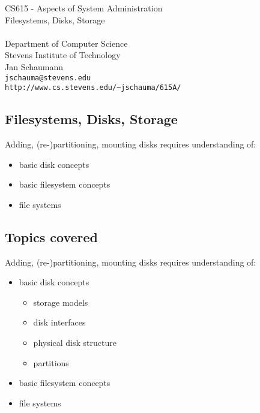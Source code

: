 \documentclass[xga]{xdvislides}
\begin{document}
\setfontphv

\lhead{\slidetitle}				%
\cfoot{\relax}					%
\rfoot{\Gray{\today}}

\vspace*{\fill}
\begin{center}
	\Hugesize
		CS615 - Aspects of System Administration\\ [1em]
		Filesystems, Disks, Storage\\ [1em]
	\hspace*{5mm}\blueline\\ [1em]
	\Normalsize
		Department of Computer Science\\
		Stevens Institute of Technology\\
		Jan Schaumann\\
		\verb+jschauma@stevens.edu+ \\
		\verb+http://www.cs.stevens.edu/~jschauma/615A/+
\end{center}
\vspace*{\fill}


\subsection{Filesystems, Disks, Storage}
Adding, (re-)partitioning, mounting disks requires understanding of:
\begin{itemize}
	\item basic disk concepts
	\item basic filesystem concepts
	\item file systems
\end{itemize}

\subsection{Topics covered}
Adding, (re-)partitioning, mounting disks requires understanding of:
\begin{itemize}
	\item basic disk concepts
		\begin{itemize}
			\item storage models
			\item disk interfaces
			\item physical disk structure
			\item partitions
		\end{itemize}
	\item basic filesystem concepts
	\item file systems
\end{itemize}
\end{document}

